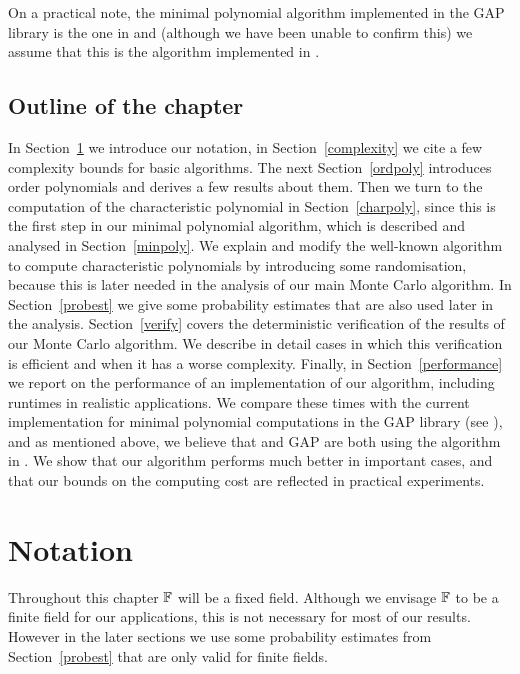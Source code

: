 On a practical note,  the minimal polynomial algorithm implemented in the GAP library
is the one in \cite{Steel} and (although we have been unable to 
confirm this) we assume that this is the algorithm implemented 
in {\MAGMA} \cite{Magma}. 

\subsection{Outline of the chapter}
In Section~\ref{notation} we introduce our notation, in
Section~\ref{complexity} we cite a few complexity bounds for basic
algorithms. The next Section~\ref{ordpoly} introduces order polynomials
and derives a few results about them. Then we turn to the computation
of the characteristic polynomial in Section~\ref{charpoly}, since this
is the first step in our minimal polynomial algorithm, which is described
and analysed in Section~\ref{minpoly}. We explain and modify the 
well-known algorithm to compute characteristic polynomials by introducing
some randomisation, because this is later needed in the analysis of our
main Monte Carlo algorithm. In Section~\ref{probest} we give some
probability estimates that are also used later in the analysis.
Section~\ref{verify}
covers the deterministic verification of the results of our
%
Monte Carlo algorithm. We describe in detail cases in which this
verification is efficient and when it has a worse complexity.
Finally, in Section~\ref{performance} we report on the performance
of an implementation of our algorithm, including runtimes in 
realistic applications.  We compare these
times with the current implementation for minimal polynomial computations
in the {\sf GAP} library (see \cite{GAP4}), and as mentioned above, we 
believe that {\MAGMA} and {\sf GAP} are both using the algorithm in 
\cite{Steel}. We show that our algorithm performs
much better in important cases, and that our bounds on the computing
cost are reflected in practical experiments.



\section{Notation}
\label{notation}

Throughout this chapter $\mathbb{F}$ will be a fixed field. Although we envisage
$\mathbb{F}$ to be a finite field for our applications, this is not necessary
for most of our results. However in the later sections we use some probability 
estimates from Section~\ref{probest} that are only valid for 
finite fields.

